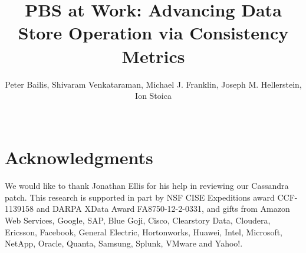 \documentclass{sig-alternate}
\begin{document}
\title{PBS at Work: Advancing Data Store Operation via Consistency Metrics}

\author{Peter Bailis, Shivaram Venkataraman, Michael J. Franklin, Joseph M. Hellerstein, Ion Stoica\\
\\
}

\sloppy
{}

\maketitle








\balance


\section{Acknowledgments}
We would like to thank Jonathan Ellis for his help in reviewing our Cassandra patch.  
This research is supported in part by NSF CISE Expeditions award CCF-1139158 and
DARPA XData Award FA8750-12-2-0331, and  gifts from Amazon Web Services, Google,
SAP,  Blue Goji, Cisco, Clearstory Data, Cloudera, Ericsson, Facebook, General
Electric, Hortonworks, Huawei, Intel, Microsoft, NetApp, Oracle, Quanta,
Samsung, Splunk, VMware and Yahoo!.



\end{document}

